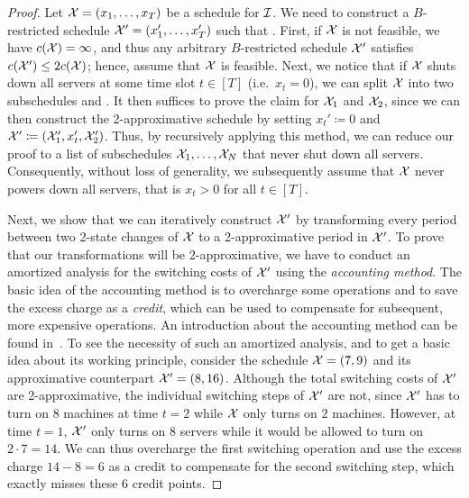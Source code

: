 \begin{proof}
Let $\mathcal{X}=(x_1,\dotsc,x_T)$ be a schedule for $\mathcal{I}$. We need to construct a $B$-restricted schedule $\mathcal{X}'=(x_1',\dotsc,x_T')$ such that .
First, if $\mathcal{X}$ is not feasible, we have $c(\mathcal{X})=\infty$, and thus any arbitrary $B$-restricted schedule $\mathcal{X}'$ satisfies $c(\mathcal{X}')\le2c(\mathcal{X})$; hence, assume that $\mathcal{X}$ is feasible. Next, we notice that if $\mathcal{X}$ shuts down all servers at some time slot $t\in[T]$ (i.e.\ $x_t=0$), we can split $\mathcal{X}$ into two subschedules  and . It then suffices to prove the claim for $\mathcal{X}_1$ and $\mathcal{X}_2$, since we can then construct the 2-approximative schedule by setting $x_t'\coloneqq 0$ and $\mathcal{X}'\coloneqq(\mathcal{X}_1',x_t',\mathcal{X}_2')$. Thus, by recursively applying this method, we can reduce our proof to a list of subschedules $\mathcal{X}_1,\dotsc,\mathcal{X}_N$ that never shut down all servers. Consequently, without loss of generality, we subsequently assume that $\mathcal{X}$ never powers down all servers, that is $x_t>0$ for all $t\in[T]$. 
	
Next, we show that we can iteratively construct $\mathcal{X}'$ by transforming every period between two 2-state changes of $\mathcal{X}$ to a 2-approximative period in $\mathcal{X}'$. 
To prove that our transformations will be 2-approximative, we have to conduct an amortized analysis for the switching costs of $\mathcal{X}'$ using the \emph{accounting method}. The basic idea of the accounting method is to overcharge some operations and to save the excess charge as a \emph{credit}, which can be used to compensate for subsequent, more expensive operations. An introduction about the accounting method can be found in~\parencite[Section~17.2]{intro-algo}. To see the necessity of such an amortized analysis, and to get a basic idea about its working principle, consider the schedule $\mathcal{X}=(7,9)$ and its approximative counterpart $\mathcal{X}'=(8,16)$. Although the total switching costs of $\mathcal{X}'$ are 2-approximative, the individual switching steps of $\mathcal{X}'$ are not, since $\mathcal{X}'$ has to turn on $8$ machines at time $t=2$ while $\mathcal{X}$ only turns on $2$ machines. However, at time $t=1$, $\mathcal{X}'$ only turns on $8$ servers while it would be allowed to turn on $2\cdot7=14$. We can thus overcharge the first switching operation and use the excess charge $14-8=6$ as a credit to compensate for the second switching step, which exactly misses these $6$ credit points.


\end{proof}
